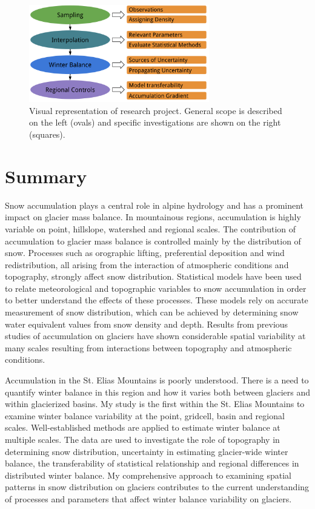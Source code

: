 \documentclass{sfuthesis}
\begin{document}
 \begin{figure}[H]
 \centering
           \includegraphics[width =0.7\textwidth]{MastersFlow.png}
       \caption{Visual representation of research project. General scope is described on the left (ovals) and specific investigations are shown on the right (squares).}
       \label{fig:flowchart_project}
\end{figure}

\section{Summary}
Snow accumulation plays a central role in alpine hydrology and has a prominent impact on glacier mass balance. In mountainous regions, accumulation is highly variable on point, hillslope, watershed and regional scales. The contribution of accumulation to glacier mass balance is controlled mainly by the distribution of snow. Processes such as orographic lifting, preferential deposition and wind redistribution, all arising from the interaction of atmospheric conditions and topography, strongly affect snow distribution. Statistical models have been used to relate meteorological and topographic variables to snow accumulation in order to better understand the effects of these processes. These models rely on accurate measurement of snow distribution, which can be achieved by determining snow water equivalent values from snow density and depth. Results from previous studies of accumulation on glaciers have shown considerable spatial variability at many scales resulting from interactions between topography and atmospheric conditions. 

Accumulation in the St. Elias Mountains is poorly understood. There is a need to quantify winter balance in this region and how it varies both between glaciers and within glacierized basins. My study is the first within the St. Elias Mountains to examine winter balance variability at the point, gridcell, basin and regional scales. Well-established methods are applied to estimate winter balance at multiple scales. The data are used to investigate the role of topography in determining snow distribution, uncertainty in estimating glacier-wide winter balance, the transferability of statistical relationship and regional differences in distributed winter balance. My comprehensive approach to examining spatial patterns in snow distribution on glaciers contributes to the current understanding of processes and parameters that affect winter balance variability on glaciers. 
\end{document}
